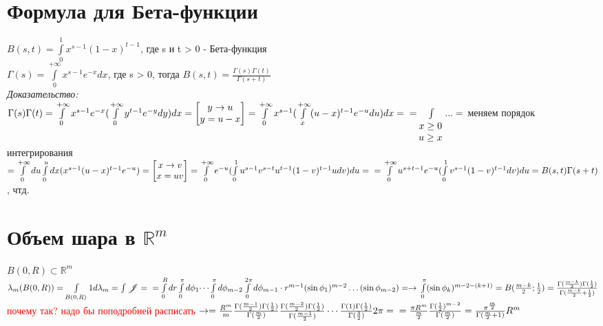 \documentclass[paper=a4, fontsize=17pt]{article}
\begin{document}
\section{Формула для Бета-функции}
$B(s, t) = \int\limits_{0}^{1}x^{s-1}(1-x)^{t-1}$, где s и t > 0 - Бета-функция \\
$\Gamma(s) = \int\limits_{0}^{+\infty}x^{s-1}e^{-x}dx$, где s > 0, тогда $B(s, t) = \frac{\Gamma(s)\Gamma(t)}{\Gamma(s+t)}$ \\
\emph{Доказательство:}\\
$\Gamma(s)\Gamma(t) = \int\limits_{0}^{+\infty}x^{s-1}e^{-x}(\int\limits_{0}^{+\infty}y^{t-1}e^{-y}dy)dx =
\begin{bmatrix}y \rightarrow u \\ y = u - x \end{bmatrix} =
\int\limits_{0}^{+\infty}x^{s-1}(\int\limits_{x}^{+\infty}(u-x)^{t-1}e^{-u}du)dx=\\
= \int\limits_{\begin{matrix}x \geq 0 \\ u \geq x \end{matrix}}...=$ меняем порядок интегрирования\\
$= \int\limits_{0}^{+\infty}du\int\limits_{0}^{u}dx (x^{s-1}(u-x)^{t-1}e^{-u})
= \begin{bmatrix} x \rightarrow v\\ x = uv \end{bmatrix}
= \int\limits_{0}^{+\infty}e^{-u}(\int\limits_{0}^{1}u^{s-1}v^{s-t}u^{t-1}(1-v)^{t-1}udv)du =\\
= \int\limits_{0}^{+\infty}u^{s+t-1}e^{-u}(\int\limits_{0}^{1}v^{s-1}(1-v)^{t-1}dv)du = B(s,t)\Gamma(s+t)$, чтд.
\section{Объем шара в $\mathbb R^m$}
$B(0, R) \subset \mathbb{R}^m$ \\
$\lambda_m(B(0, R)) = \int\limits_{B(0, R)}1d\lambda_m = \int \mathcal{J} = \\
= \int\limits_{0}^{R}dr\int\limits_{0}^{\pi}d\phi_1\dots\int\limits_{0}^{\pi}d\phi_{m-2} \int\limits_{0}^{2\pi}d\phi_{m-1} \cdot r^{m-1}(\sin\phi_1)^{m-2} \dots (\sin\phi_{m-2}) =\rightarrow\\
\int\limits_{0}^{\pi}(\sin\phi_k)^{m-2-(k+1)} = B({\frac{m-k}{2}}; \frac{1}{2}) = \frac{\Gamma(\frac{m-k}{2})\Gamma(\frac{1}{2})}{\Gamma(\frac{m-k}{2}+\frac{1}{2})} $\textcolor{red}{почему так? надо бы поподробней расписать}$\\
\rightarrow= \frac{R^m}{m} \frac{\Gamma(\frac{m-1}{2}) \Gamma(\frac{1}{2})}{\Gamma(\frac{m}{2})} \frac{\Gamma(\frac{m-2}{2})\Gamma(\frac{1}{2})}{\Gamma(\frac{m-1}{2})} \cdots \frac{\Gamma(1) \Gamma(\frac{1}{2})}{\Gamma(\frac{3}{2})} 2\pi =\\
= \frac{\pi R^m}{\frac{m}{2}} \frac{\Gamma(\frac{1}{2})^{m-2}}{\Gamma(\frac{m}{2})} = \frac{\pi^{\frac{m}{2}}}{\Gamma(\frac{m}{2}+1)}R^m$
\end{document}
